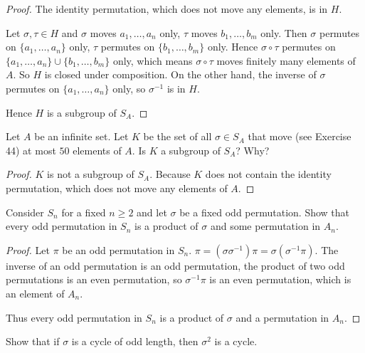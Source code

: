 \begin{proof}
    The identity permutation, which does not move any elements, is in $H$.

    Let $\sigma,\tau\in H$ and $\sigma$ moves $a_{1}, \ldots, a_{n}$ only, $\tau$ moves $b_{1}, \ldots, b_{m}$ only. Then $\sigma$ permutes on $\{ a_{1}, \ldots, a_{n} \}$ only, $\tau$ permutes on $\{ b_{1}, \ldots, b_{m} \}$ only. Hence $\sigma\circ\tau$ permutes on $\{ a_{1},\ldots, a_{n} \} \cup \{ b_{1}, \ldots, b_{m} \}$ only, which means $\sigma\circ\tau$ moves finitely many elements of $A$. So $H$ is closed under composition. On the other hand, the inverse of $\sigma$ permutes on $\{ a_{1}, \ldots, a_{n} \}$ only, so $\sigma^{-1}$ is in $H$.

    Hence $H$ is a subgroup of $S_{A}$.
\end{proof}

\begin{exercise}
    Let $A$ be an infinite set. Let $K$ be the set of all $\sigma\in S_{A}$ that move (see Exercise 44) at most $50$ elements of $A$. Is $K$ a subgroup of $S_{A}$? Why?
\end{exercise}

\begin{proof}
    $K$ is not a subgroup of $S_{A}$. Because $K$ does not contain the identity permutation, which does not move any elements of $A$.
\end{proof}

\begin{exercise}
    Consider $S_{n}$ for a fixed $n\geq 2$ and let $\sigma$ be a fixed odd permutation. Show that every odd permutation in $S_{n}$ is a product of $\sigma$ and some permutation in $A_{n}$.
\end{exercise}

\begin{proof}
    Let $\pi$ be an odd permutation in $S_{n}$. $\pi = (\sigma\sigma^{-1})\pi = \sigma(\sigma^{-1}\pi)$. The inverse of an odd permutation is an odd permutation, the product of two odd permutations is an even permutation, so $\sigma^{-1}\pi$ is an even permutation, which is an element of $A_{n}$.

    Thus every odd permutation in $S_{n}$ is a product of $\sigma$ and a permutation in $A_{n}$.
\end{proof}

\begin{exercise}
    Show that if $\sigma$ is a cycle of odd length, then $\sigma^{2}$ is a cycle.
\end{exercise}

